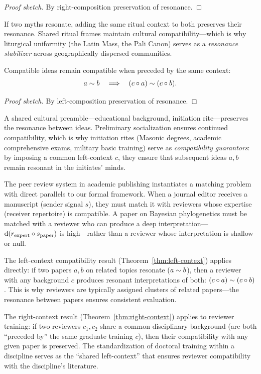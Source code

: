 \begin{proof}[Proof sketch]
By right-composition preservation of resonance.
\end{proof}

If two myths resonate, adding the same ritual context to both preserves their
resonance.  Shared ritual frames maintain cultural compatibility---which is
why liturgical uniformity (the Latin Mass, the Pali Canon) serves as a
\emph{resonance stabilizer} across geographically dispersed communities.

\begin{theorem}
\label{thm:left-context}
Compatible ideas remain compatible when preceded by the same context:
\[
  a \sim b
  \quad\Longrightarrow\quad
  (c \circ a) \sim (c \circ b).
\]
\end{theorem}

\begin{proof}[Proof sketch]
By left-composition preservation of resonance.
\end{proof}

A shared cultural preamble---educational background, initiation rite---preserves
the resonance between ideas.  Preliminary socialization ensures continued
compatibility, which is why initiation rites (Masonic degrees, academic
comprehensive exams, military basic training) serve as \emph{compatibility
guarantors}: by imposing a common left-context $c$, they ensure that
subsequent ideas $a, b$ remain resonant in the initiates' minds.

\begin{example}
The peer review system in academic publishing instantiates a matching
problem with direct parallels to our formal framework.  When a journal
editor receives a manuscript (sender signal $s$), they must match it with
reviewers whose expertise (receiver repertoire) is compatible.  A paper
on Bayesian phylogenetics must be matched with a reviewer who can produce
a deep interpretation---$\operatorname{d}(r_{\text{expert}} \circ s_{\text{paper}})$
is high---rather than a reviewer whose interpretation is shallow or null.

The left-context compatibility result (Theorem~\ref{thm:left-context})
applies directly: if two papers $a, b$ on related topics resonate
($a \sim b$), then a reviewer with any background $c$ produces resonant
interpretations of both: $(c \circ a) \sim (c \circ b)$.  This is
why reviewers are typically assigned clusters of related papers---the
resonance between papers ensures consistent evaluation.

The right-context result (Theorem~\ref{thm:right-context}) applies to
reviewer training: if two reviewers $c_1, c_2$ share a common disciplinary
background (are both ``preceded by'' the same graduate training $c$), then
their compatibility with any given paper is preserved.  The
standardization of doctoral training within a discipline serves as the
``shared left-context'' that ensures reviewer compatibility with the
discipline's literature.
\end{example}

